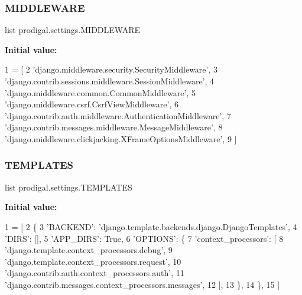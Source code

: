 \subsubsection{\texorpdfstring{M\+I\+D\+D\+L\+E\+W\+A\+RE}{MIDDLEWARE}}
{\footnotesize\ttfamily list prodigal.\+settings.\+M\+I\+D\+D\+L\+E\+W\+A\+RE}

{\bfseries Initial value\+:}
\begin{DoxyCode}
1 =  [
2     \textcolor{stringliteral}{'django.middleware.security.SecurityMiddleware'},
3     \textcolor{stringliteral}{'django.contrib.sessions.middleware.SessionMiddleware'},
4     \textcolor{stringliteral}{'django.middleware.common.CommonMiddleware'},
5     \textcolor{stringliteral}{'django.middleware.csrf.CsrfViewMiddleware'},
6     \textcolor{stringliteral}{'django.contrib.auth.middleware.AuthenticationMiddleware'},
7     \textcolor{stringliteral}{'django.contrib.messages.middleware.MessageMiddleware'},
8     \textcolor{stringliteral}{'django.middleware.clickjacking.XFrameOptionsMiddleware'},
9 ]
\end{DoxyCode}
\mbox{\label{namespaceprodigal_1_1settings_a95950e4585e2e539204edefeba42eac6}} 
\subsubsection{\texorpdfstring{T\+E\+M\+P\+L\+A\+T\+ES}{TEMPLATES}}
{\footnotesize\ttfamily list prodigal.\+settings.\+T\+E\+M\+P\+L\+A\+T\+ES}

{\bfseries Initial value\+:}
\begin{DoxyCode}
1 =  [
2     \{
3         \textcolor{stringliteral}{'BACKEND'}: \textcolor{stringliteral}{'django.template.backends.django.DjangoTemplates'},
4         \textcolor{stringliteral}{'DIRS'}: [],
5         \textcolor{stringliteral}{'APP\_DIRS'}: \textcolor{keyword}{True},
6         \textcolor{stringliteral}{'OPTIONS'}: \{
7             \textcolor{stringliteral}{'context\_processors'}: [
8                 \textcolor{stringliteral}{'django.template.context\_processors.debug'},
9                 \textcolor{stringliteral}{'django.template.context\_processors.request'},
10                 \textcolor{stringliteral}{'django.contrib.auth.context\_processors.auth'},
11                 \textcolor{stringliteral}{'django.contrib.messages.context\_processors.messages'},
12             ],
13         \},
14     \},
15 ]
\end{DoxyCode}

